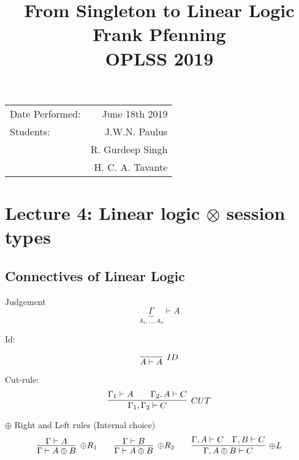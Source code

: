 \documentclass{article}
\title{From Singleton to Linear Logic \\ Frank Pfenning \\ OPLSS 2019} %
\begin{document}
	\date{}
	\maketitle %
	
	\begin{center}
		\begin{tabular}{l r}
			Date Performed: & June 18th 2019 \\ %
			Students: & J.W.N. Paulus  \\
			& R. Gurdeep Singh \\ %
			& H. C. A. Tavante
		\end{tabular}
	\end{center}
	
	
	\setcounter{section}{3} %
	\section{Lecture 4: Linear logic \(\otimes\) session types}
	\subsection{Connectives of Linear Logic}

	Judgement 
	\[
	\underbrace{\Gamma}_{A_1,...,A_n} \vdash A
	\]

	Id:

	\[
	\infer[\scriptsize{ID}]
	{A \vdash A}
	{}
	\]

	Cut-rule:
	\[
	\infer[\scriptsize{CUT}]
	{\Gamma_{1}, \Gamma_{2} \vdash C}
	{\Gamma_{1} \vdash A \hspace{2em} \Gamma_{2}, A \vdash C}
	\]

  $\oplus$ Right and Left rules (Internal choice)
	\[
	\infer[\oplus\scriptsize{R_1}]
	{\Gamma \vdash A \oplus B}{\Gamma \vdash A}
	\qquad
	\infer[\oplus\scriptsize{R_2}]
	{\Gamma \vdash A \oplus B}{\Gamma \vdash B}
	\qquad
	\infer[\oplus\scriptsize{L}]
	{\Gamma, A \oplus B \vdash C}{\Gamma, A \vdash C \hspace{1em} \Gamma, B \vdash C}
	\]
\end{document}
